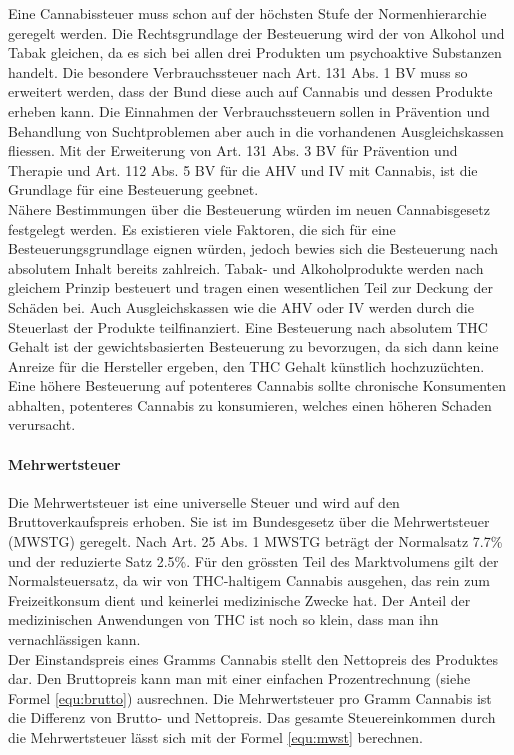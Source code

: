\documentclass[../main.tex]{subfiles}
\begin{document}
	 \noindent
	 Eine Cannabissteuer muss schon auf der höchsten Stufe der Normenhierarchie geregelt werden. 
	 Die Rechtsgrundlage der Besteuerung wird der von Alkohol und Tabak gleichen, da es sich bei allen drei Produkten um psychoaktive Substanzen handelt.
	 Die besondere Verbrauchssteuer nach Art. 131 Abs. 1 BV muss so erweitert werden, dass der Bund diese auch auf Cannabis und dessen Produkte erheben kann.
	 Die Einnahmen der Verbrauchssteuern sollen in Prävention und Behandlung von Suchtproblemen aber auch in die vorhandenen Ausgleichskassen fliessen.
	 Mit der Erweiterung von Art. 131 Abs. 3 BV für Prävention und Therapie und Art. 112 Abs. 5 BV für die AHV und IV mit Cannabis, ist die Grundlage für eine Besteuerung geebnet.\\
	 	 
	 \noindent
	 Nähere Bestimmungen über die Besteuerung würden im neuen Cannabisgesetz festgelegt werden.
	 Es existieren viele Faktoren, die sich für eine Besteuerungsgrundlage eignen würden, jedoch bewies sich die Besteuerung nach absolutem Inhalt bereits zahlreich.
	 Tabak- und Alkoholprodukte werden nach gleichem Prinzip besteuert und tragen einen wesentlichen Teil zur Deckung der Schäden bei.
	 Auch Ausgleichskassen wie die AHV oder IV werden durch die Steuerlast der Produkte teilfinanziert.
	 Eine Besteuerung nach absolutem THC Gehalt ist der gewichtsbasierten Besteuerung zu bevorzugen, da sich dann keine Anreize für die Hersteller ergeben, den THC Gehalt künstlich hochzuzüchten.
	 Eine höhere Besteuerung auf potenteres Cannabis sollte chronische Konsumenten abhalten, potenteres Cannabis zu konsumieren, welches einen höheren Schaden verursacht.  
	 
	 \paragraph{Mehrwertsteuer}
	 Die Mehrwertsteuer ist eine universelle Steuer und wird auf den Bruttoverkaufspreis erhoben.
	 Sie ist im Bundesgesetz über die Mehrwertsteuer (MWSTG) geregelt.
	 Nach Art. 25 Abs. 1 MWSTG beträgt der Normalsatz 7.7\% und der reduzierte Satz 2.5\%.
	 Für den grössten Teil des Marktvolumens gilt der Normalsteuersatz, da wir von THC-haltigem Cannabis ausgehen, das rein zum Freizeitkonsum dient und keinerlei medizinische Zwecke hat. 
	 Der Anteil der medizinischen Anwendungen von THC ist noch so klein, dass man ihn vernachlässigen kann.\\
	 
	 \noindent
	 Der Einstandspreis eines Gramms Cannabis stellt den Nettopreis des Produktes dar.
	 Den Bruttopreis kann man mit einer einfachen Prozentrechnung (siehe Formel \ref{equ:brutto}) ausrechnen. 
	 Die Mehrwertsteuer pro Gramm Cannabis ist die Differenz von Brutto- und Nettopreis.
	 Das gesamte Steuereinkommen durch die Mehrwertsteuer lässt sich mit der Formel \ref{equ:mwst} berechnen.\\
	 
\end{document}
